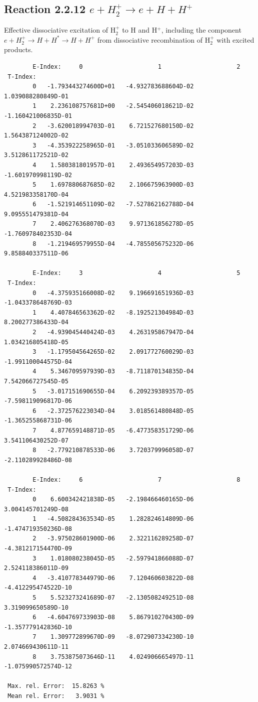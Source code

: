 \documentclass[12pt,dvips]{article}
\begin{document}
\subsection{
Reaction 2.2.12 $  e + H_2^+   \rightarrow  e + H + H^+  $
}
Effective dissociative excitation of H$_2^+$ to H and H$^+$, including the
component $e+H_2^+ \rightarrow H + H^* \rightarrow H + H^+$ from dissociative recombination of H$_2^+$ with excited products.

\begin{small}\begin{verbatim}
        E-Index:     0                     1                     2
 T-Index:
        0   -1.793443274600D+01   -4.932783688604D-02    1.039088280849D-01
        1    2.236108757681D+00   -2.545406018621D-02   -1.160421006835D-01
        2   -3.620018994703D-01    6.721527680150D-02    1.564387124002D-02
        3   -4.353922258965D-01   -3.051033606589D-02    3.512861172521D-02
        4    1.580381801957D-01    2.493654957203D-03   -1.601970998119D-02
        5    1.697880687685D-02    2.106675963900D-03    4.521983358170D-04
        6   -1.521914651109D-02   -7.527862162788D-04    9.095551479381D-04
        7    2.406276368070D-03    9.971361856278D-05   -1.760978402353D-04
        8   -1.219469579955D-04   -4.785505675232D-06    9.858840337511D-06

        E-Index:     3                     4                     5
 T-Index:
        0   -4.375935166008D-02    9.196691651936D-03   -1.043378648769D-03
        1    4.407846563362D-02   -8.192521304984D-03    8.200277386433D-04
        2   -4.939045440424D-03    4.263195867947D-04    1.034216805418D-05
        3   -1.179504564265D-02    2.091772760029D-03   -1.991100044575D-04
        4    5.346709597939D-03   -8.711870134835D-04    7.542066727545D-05
        5   -3.017151690655D-04    6.209239389357D-05   -7.598119096817D-06
        6   -2.372576223034D-04    3.018561480848D-05   -1.365255868731D-06
        7    4.877659148871D-05   -6.477358351729D-06    3.541106430252D-07
        8   -2.779210878533D-06    3.720379996058D-07   -2.110289928486D-08

        E-Index:     6                     7                     8
 T-Index:
        0    6.600342421838D-05   -2.198466460165D-06    3.004145701249D-08
        1   -4.508284363534D-05    1.282824614809D-06   -1.474719350236D-08
        2   -3.975028601900D-06    2.322116289258D-07   -4.381217154470D-09
        3    1.018080238045D-05   -2.597941866088D-07    2.524118386011D-09
        4   -3.410778344979D-06    7.120460603822D-08   -4.412295474522D-10
        5    5.523273241689D-07   -2.130508249251D-08    3.319099650589D-10
        6   -4.604769733903D-08    5.867910270430D-09   -1.357779142836D-10
        7    1.309772899670D-09   -8.072907334230D-10    2.074669430611D-11
        8    3.753875073646D-11    4.024906665497D-11   -1.075990572574D-12

 Max. rel. Error:  15.8263 %
 Mean rel. Error:   3.9031 %

\end{verbatim}\end{small}
\end{document}
